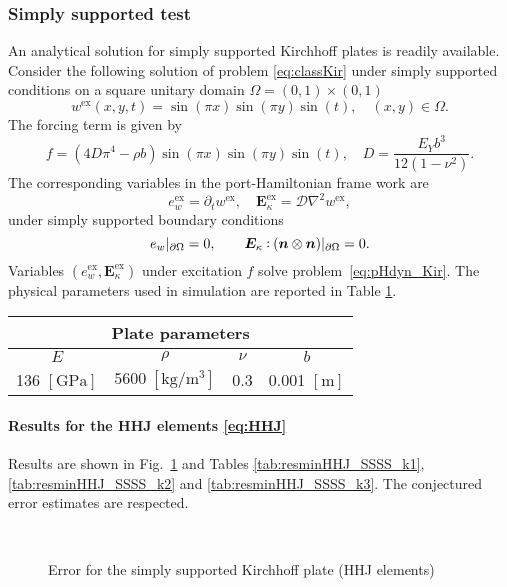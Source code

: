 \subsubsection{Simply supported test}
An analytical solution for simply supported Kirchhoff plates is readily available. Consider the following solution of problem \eqref{eq:classKir} under simply supported conditions on a square unitary domain $\Omega = (0,1)\times (0,1)$
\[
w^{\text{ex}}(x,y,t) = \sin(\pi x) \sin(\pi y) \sin(t), \quad  (x, y) \in \Omega.
\] 
The forcing term is given by  
\[
f = (4 D \pi^4 - \rho b) \sin(\pi x) \sin(\pi y) \sin(t), \quad D = \frac{E_Y b^3}{12 (1-\nu^2)}.
\]
The corresponding variables in the port-Hamiltonian frame work are
\[
e_w^{\text{ex}} = \partial_t w^{\text{ex}}, \quad \bm{E}_\kappa^{\text{ex}} = \mathcal{D} \nabla^2 w^{\text{ex}},
\]
under simply supported boundary conditions
\[
e_w\vert_{\partial\Omega} = 0, \qquad \bm{E}_\kappa \cddot (\bm{n} \otimes \bm{n})\vert_{\partial\Omega} = 0.
\]
Variables $(e_w^{\text{ex}}, \bm{E}_\kappa^{\text{ex}})$ under excitation $f$ solve problem~\eqref{eq:pHdyn_Kir}. The physical parameters used in simulation are reported in Table \ref{tab:parKir}. 

\begin{table}[h]
	\centering
	\begin{tabular}{cccc}
		\hline 
		\multicolumn{4}{c}{Plate parameters} \\ 
		\hline 
		$E$ & $\rho$ & $\nu$  & $b$ \\
		136 $[\textrm{GPa}]$ & $5600\; [\textrm{kg}/\textrm{m}^3]$ & 0.3 &  0.001 $[\textrm{m}]$\\ 
		\hline 
	\end{tabular} 
	\captionsetup{width=0.95\linewidth}
	\vspace{1mm}
	\label{tab:parKir}
\end{table}


\paragraph{Results for the HHJ elements \eqref{eq:HHJ}}
Results are shown in Fig.~\ref{fig:errorHHJ_SSSS} and Tables \ref{tab:resminHHJ_SSSS_k1}, \ref{tab:resminHHJ_SSSS_k2} and \ref{tab:resminHHJ_SSSS_k3}. The conjectured error estimates are respected.

\begin{figure}[h]%
	\centering
	\hspace{8pt}%
	 \\
	\caption{Error for the simply supported Kirchhoff plate (HHJ elements)}%
	\label{fig:errorHHJ_SSSS}%
\end{figure}



